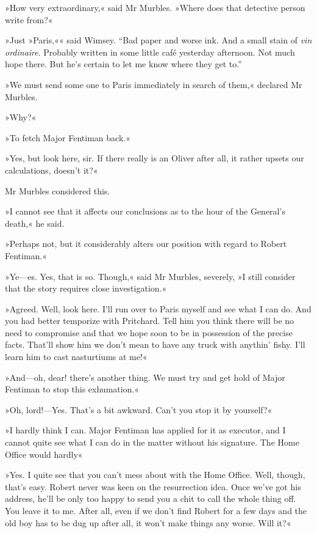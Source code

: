 »How very extraordinary,« said Mr Murbles. »Where does that detective person write from?«

»Just »Paris,«« said Wimsey. \enquote{Bad paper and worse ink. And a small stain of \textit{vin ordinaire}. Probably written in some little café yesterday afternoon. Not much hope there. But he's certain to let me know where they get to.}

»We must send some one to Paris immediately in search of them,« declared Mr Murbles.

»Why?«

»To fetch Major Fentiman back.«

»Yes, but look here, sir. If there really is an Oliver after all, it rather upsets our calculations, doesn't it?«

Mr Murbles considered this.

»I cannot see that it affects our conclusions as to the hour of the General's death,« he said.

»Perhaps not, but it considerably alters our position with regard to Robert Fentiman.«

»Ye\allowbreak---\allowbreak es. Yes, that is so. Though,« said Mr Murbles, severely, »I still consider that the story requires close investigation.«

»Agreed. Well, look here. I'll run over to Paris myself and see what I can do. And you had better temporize with Pritchard. Tell him you think there will be no need to compromise and that we hope soon to be in possession of the precise facts. That'll show him we don't mean to have any truck with anythin' fishy. I'll learn him to cast nasturtiums at me!«

»And\allowbreak---\allowbreak oh, dear! there's another thing. We must try and get hold of Major Fentiman to stop this exhumation.«

»Oh, lord!---Yes. That's a bit awkward. Can't you stop it by yourself?«

»I hardly think I can. Major Fentiman has applied for it as executor, and I cannot quite see what I can do in the matter without his signature. The Home Office would hardly\longdash«

»Yes. I quite see that you can't mess about with the Home Office. Well, though, that's easy. Robert never was keen on the resurrection idea. Once we've got his address, he'll be only too happy to send you a chit to call the whole thing off. You leave it to me. After all, even if we don't find Robert for a few days and the old boy has to be dug up after all, it won't make things any worse. Will it?«

